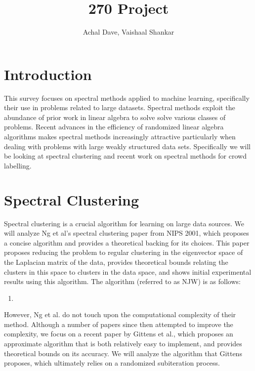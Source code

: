 \documentclass{article}
\title{270 Project}
\author{Achal Dave, Vaishaal Shankar}
\date
\begin{document}
\maketitle
\tableofcontents 
\clearpage

\section{Introduction}
This survey focuses on spectral methods applied to machine learning, specifically their use in problems related to large datasets. Spectral methods exploit the abundance of prior work in linear algebra to solve solve various classes of problems. Recent advances in the efficiency of randomized linear algebra algorithms makes spectral methods increasingly attractive particularly when dealing with problems with large weakly structured data sets. Specifically we will be looking at spectral clustering and recent work on spectral methods for crowd labelling.

\section{Spectral Clustering}
	Spectral clustering is a crucial algorithm for learning on large data sources. We will analyze Ng et al's \cite{ng2002spectral} spectral clustering paper from NIPS 2001, which proposes a concise algorithm and provides a theoretical backing for its choices. This paper proposes reducing the problem to regular clustering in the eigenvector space of the Laplacian matrix of the data, provides theoretical bounds relating the clusters in this space to clusters in the data space, and shows initial experimental results using this algorithm.
    The algorithm (referred to as NJW) is as follows:
    \begin{enumerate}
    \item 
    \end{enumerate}
	
	However, Ng et al. do not touch upon the computational complexity of their method. Although a number of papers since then attempted to improve the complexity, we focus on a recent paper by Gittens et al.\cite{gittens2013approximate}, which proposes an approximate algorithm that is both relatively easy to implement, and provides theoretical bounds on its accuracy. We will analyze the algorithm that Gittens proposes, which ultimately relies on a randomized subiteration process. 


\newpage
\end{document}
